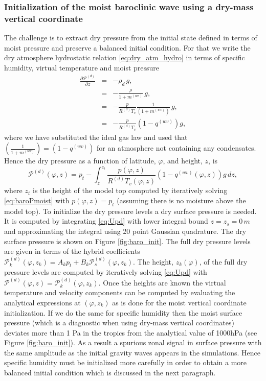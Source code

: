 \documentclass{agujournal}
\begin{document}
\subsubsection{Initialization of the moist baroclinic wave using a dry-mass vertical coordinate}
The challenge is to extract dry pressure from the initial state defined in terms of moist pressure and preserve a balanced initial condition. For that we write the dry atmosphere hydrostatic relation \eqref{eq:dry_atm_hydro} in terms of specific humidity, virtual temperature and moist pressure
\begin{eqnarray}
\frac{\partial \mathcal{P}^{(d)}}{\partial z}&=&-\rho_d\, g,\\
&=&-\frac{\rho}{1+m^{(wv)}}\, g,\\
&=&-\frac{p}{R^{(d)}T_v}\frac{1}{\left( 1+m^{(wv)}\right)}\, g,\\
&=&-\frac{p}{R^{(d)}T_v}\left(1-q^{(wv)}\right)g,
\end{eqnarray}
where we have substituted the ideal gas law and used that $\left( \frac{1}{1+m^{(wv)}} \right)=\left( 1-q^{(wv)} \right)$ for an atmosphere not containing any condensates. Hence the dry pressure as a function of latitude, $\varphi$, and height, $z$, is
\begin{equation}
{\mathcal{P}}^{(d)}(\varphi,z)=p_t-\int_z^{z_t}\frac{p(\varphi,z)}{R^{(d)} T_v(\varphi,z)}\left(1-q^{(wv)}(\varphi,z)\right) g\, dz,\label{eq:Upd}
\end{equation}
where $z_t$ is the height of the model top computed by iteratively solving \eqref{eq:baroPmoist} with $p(\varphi,z)=p_t$ (assuming there is no moisture above the model top). To initialize the dry pressure levels a dry surface pressure is needed. It is computed by integrating \eqref{eq:Upd} with lower integral bound $z=z_s=0\, m$ and approximating the integral using 20 point Gaussian quadrature. The dry surface pressure is shown on Figure \ref{fig:baro_init}. The full dry pressure levels are given in terms of the hybrid coefficients ${\mathcal{P}_k^{(d)}}(\varphi,z_k)=A_k p_t+B_k {\mathcal{P}_s^{(d)}}(\varphi,z_k)$. The height, $z_{k}(\varphi)$, of the full dry pressure levels are computed by iteratively solving \eqref{eq:Upd} with ${\mathcal{P}}^{(d)}(\varphi,z)={\mathcal{P}}_{k}^{(d)}(\varphi,z_k)$. Once the heights are known the virtual temperature and velocity components can be computed by evaluating the analytical expressions at $(\varphi,z_k)$ as is done for the moist vertical coordinate initialization. If we do the same for specific humidity then the moist surface pressure (which is a diagnostic when using dry-mass vertical coordinates) deviates more than 1 Pa in the tropics from the analytical value of 1000hPa  (see Figure \ref{fig:baro_init}). As a result a spurious zonal signal in surface pressure with the same amplitude as the initial gravity waves appears in the simulations. Hence specific humidity must be initialized more carefully in order to obtain a more balanced initial condition which is discussed in the next paragraph. 
\end{document}
